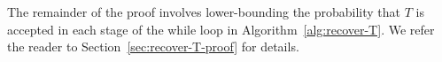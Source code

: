 The remainder of the proof involves lower-bounding the probability 
that $T$ is accepted in each stage of the while loop in 
Algorithm~\ref{alg:recover-T}.
We refer the reader to Section~\ref{sec:recover-T-proof} for details.
%

